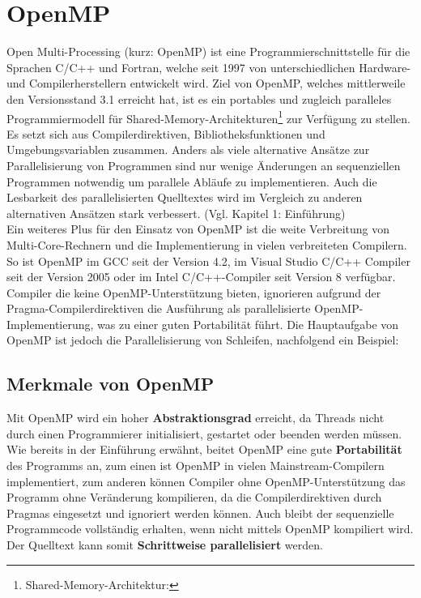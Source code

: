 \documentclass{lni}
\begin{document}
\setcounter{page}{1} %
\section{OpenMP}
Open Multi-Processing (kurz: OpenMP) ist eine Programmierschnittstelle für die Sprachen C/C++ und Fortran, welche seit 1997 von unterschiedlichen Hardware- und Compilerherstellern entwickelt wird. Ziel von OpenMP, welches mittlerweile den Versionsstand 3.1 erreicht hat, ist es ein portables und zugleich paralleles Programmiermodell für Shared-Memory-Architekturen\footnote{Shared-Memory-Architektur: } zur Verfügung zu stellen. Es setzt sich aus Compilerdirektiven, Bibliotheksfunktionen und Umgebungsvariablen zusammen. Anders als viele alternative Ansätze zur Parallelisierung von Programmen sind nur wenige Änderungen an sequenziellen Programmen notwendig um parallele Abläufe zu implementieren. Auch die Lesbarkeit des parallelisierten Quelltextes wird im Vergleich zu anderen alternativen Ansätzen stark verbessert. (Vgl. \cite{omp08} Kapitel 1: Einführung) \\
Ein weiteres Plus für den Einsatz von OpenMP ist die weite Verbreitung von Multi-Core-Rechnern und die Implementierung in vielen verbreiteten Compilern. So ist OpenMP im GCC seit der Version 4.2, im Visual Studio C/C++ Compiler seit der Version 2005 oder im Intel C/C++-Compiler seit Version 8 verfügbar. Compiler die keine OpenMP-Unterstützung bieten, ignorieren aufgrund der Pragma-Compilerdirektiven die Ausführung als parallelisierte OpenMP-Implementierung, was zu einer guten Portabilität führt. Die Hauptaufgabe von OpenMP ist jedoch die Parallelisierung von Schleifen, nachfolgend ein Beispiel: \\


\subsection{Merkmale von OpenMP}

Mit OpenMP wird ein hoher \textbf{Abstraktionsgrad} erreicht, da Threads nicht durch einen Programmierer initialisiert, gestartet oder beenden werden müssen. Wie bereits in der Einführung erwähnt, beitet OpenMP eine gute \textbf{Portabilität} des Programms an, zum einen ist OpenMP in vielen Mainstream-Compilern implementiert, zum anderen können Compiler ohne OpenMP-Unterstützung das Programm ohne Veränderung kompilieren, da die Compilerdirektiven durch Pragmas eingesetzt und ignoriert werden können. Auch bleibt der sequenzielle Programmcode vollständig erhalten, wenn nicht mittels OpenMP kompiliert wird. Der Quelltext kann somit \textbf{Schrittweise parallelisiert} werden. \\
\end{document}
